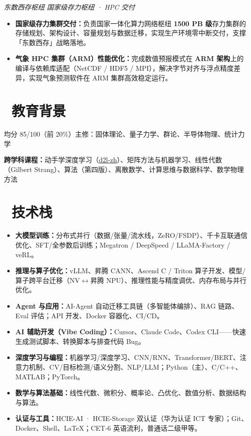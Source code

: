 \documentclass{resume}
\begin{document}
\textit{东数西存枢纽} \quad \textit{国家级存力枢纽 · HPC 交付}
\begin{itemize}
  \item \textbf{国家级存力集群交付：}负责国家一体化算力网络枢纽\textbf{ 1500 PB 级}存力集群的存储规划、架构设计、容量规划与数据迁移，实现生产环境零中断交付，支撑「东数西存」战略落地。
  \item \textbf{气象 HPC 集群（ARM）性能优化：}完成数值预报模式在 \textbf{ARM 架构}上的编译与依赖库适配（NetCDF / HDF5 / MPI），解决字节对齐与浮点精度差异，实现气象预测软件在 ARM 集群高效稳定运行。
\end{itemize}

\section{\texorpdfstring{\faGraduationCap\ }{}教育背景}

均分 85/100（前 20\%）\quad 主修：固体理论、量子力学、群论、半导体物理、统计力学

\vspace{0.5ex}
\textbf{跨学科课程：}动手学深度学习（\href{https://github.com/d2l-ai/d2l-zh}{d2l-zh}）、矩阵方法与机器学习、线性代数（Gilbert Strang）、算法（第四版）、离散数学、计算思维与数据科学、数学物理方法

\section{\texorpdfstring{\faCogs\ }{}技术栈}
\begin{itemize}[parsep=0.5ex]
  \item \textbf{大模型训练：}分布式并行（数据/张量/流水线，ZeRO/FSDP）、千卡互联通信优化、SFT/全参数后训练；Megatron / DeepSpeed / LLaMA-Factory / veRL。
  \item \textbf{推理与算子优化：}vLLM、昇腾 CANN、Ascend C / Triton 算子开发、模型/算子跨平台迁移（NV$\leftrightarrow$昇腾 NPU）、推理性能与精度调优、内存布局与并行优化。
  \item \textbf{Agent 与应用：}AI-Agent 自动迁移工具链（多智能体编排）、RAG 链路、Eval 评估；API 开发、Docker 容器化、CI/CD。
  \item \textbf{AI 辅助开发（Vibe Coding）：}Cursor、Claude Code、Codex CLI——快速生成测试脚本、转换脚本与排查代码 Bug。
  \item \textbf{深度学习与编程：}机器学习/深度学习、CNN/RNN、Transformer/BERT、注意力机制、CV/目标检测/语义分割、NLP/LLM；Python（主）、C/C++、MATLAB；PyTorch。
  \item \textbf{数学与算法基础：}线性代数、微积分、概率论、凸优化、数值分析、数据结构与算法。
  \item \textbf{认证与工具：}HCIE-AI · HCIE-Storage 双认证（华为认证 ICT 专家）；Git、Docker、Shell、\LaTeX；CET-6 英语流利，普通话二级甲等。
\end{itemize}
\end{document}
